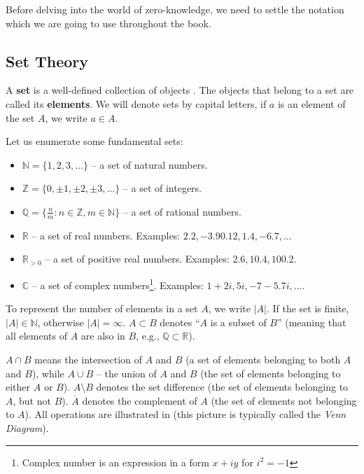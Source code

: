 \documentclass[../lecture-notes-148x210.tex]{subfiles}
\begin{document}
Before delving into the world of zero-knowledge, we need to settle the notation
which we are going to use throughout the book. 

\subsection*{Set Theory}

A \textbf{set} is a well-defined collection of objects \cite[section 1]{Judson_2012}. The objects that belong to a set are called 
its \textbf{elements}. We will denote sets by capital letters, if $a$ is an element of the set $A$, 
we write $a \in A$.

Let us enumerate some fundamental sets:

\begin{itemize}
    \item $\mathbb{N} = \{1, 2, 3, \dots\}$ -- a set of natural numbers.
    \item $\mathbb{Z} = \{0, \pm 1, \pm 2, \pm 3, \dots\}$ -- a set of integers.
    \item $\mathbb{Q} = \{\frac{n}{m}: n \in \mathbb{Z}, m \in \mathbb{N}\}$ -- a set of rational numbers.
    \item $\mathbb{R}$ -- a set of real numbers. Examples: $2.2, -3.9 0.12, 1.4, -6.7, \dots$
    \item $\mathbb{R}_{>0}$ -- a set of positive real numbers. Examples: $2.6, 10.4, 100.2$.
    \item $\mathbb{C}$ -- a set of complex numbers\footnote{Complex number is an expression in a form $x+iy$ for $i^2=-1$}. 
    Examples: $1+2i, 5i, -7-5.7i, \dots$.
\end{itemize}

To represent the number of elements in a set $A$, we write $|A|$. If the set is finite, $|A| \in \mathbb{N}$, 
otherwise $|A| = \infty$. $A \subset B$ denotes ``$A$ is a subset of $B$'' (meaning that all elements of $A$ 
are also in $B$, e.g., $\mathbb{Q} \subset \mathbb{R}$).

$A \cap B$ means the intersection of $A$ and $B$ (a set of elements belonging to both $A$ and $B$), while 
$A \cup B$ -- the union of $A$ and $B$ (the set of elements belonging to either $A$ or $B$). $A \setminus B$ 
denotes the set difference (the set of elements belonging to $A$, but not $B$). $\overline{A}$ denotes the 
complement of $A$ (the set of elements not belonging to $A$). All operations are illustrated in 
 (this picture is typically called the \textit{Venn Diagram}).
\end{document}

